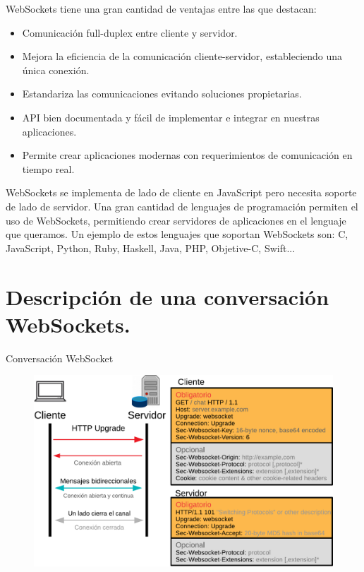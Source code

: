 \documentclass[usenames,dvipsnames]{beamer}
\begin{document}
\begin{frame}
WebSockets tiene una gran cantidad de ventajas entre las que destacan:
\begin{itemize}
\item Comunicación full-duplex entre cliente y servidor.
\item Mejora la eficiencia de la comunicación cliente-servidor, estableciendo una única conexión.
\item Estandariza las comunicaciones evitando soluciones propietarias.
\item API bien documentada y fácil de implementar e integrar en nuestras aplicaciones.
\item Permite crear aplicaciones modernas con requerimientos de comunicación en tiempo real.
\end{itemize}
\end{frame}

\begin{frame}
	WebSockets se implementa de lado de cliente en JavaScript pero necesita soporte de lado de servidor. Una gran cantidad de lenguajes de programación permiten el uso de WebSockets, permitiendo crear servidores de aplicaciones en el lenguaje que queramos. Un ejemplo de estos lenguajes que soportan WebSockets son: C, JavaScript, Python, Ruby, Haskell, Java, PHP, Objetive-C, Swift...
\end{frame}

\section{Descripción de una conversación WebSockets. }
\begin{frame}{Conversación WebSocket }

\begin{figure}[H]
\centering
\includegraphics[scale=0.5]{imagenes/diagrama.pdf}
\end{figure}
\end{frame}
\end{document}
